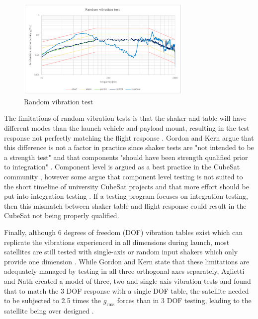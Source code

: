 \documentclass[a4paper,11pt]{article}
\begin{document}
\begin{figure}[H]
  \centering
  \includegraphics[width=0.75\textwidth]{images/random.png}
  \caption{Random vibration test \cite{nieto2019cubesat}}
  \label{fig:random}
\end{figure}

The limitations of random vibration tests is that the shaker and table will have different modes than the launch vehicle and payload mount, resulting in the test response not perfectly matching the flight response \cite{gordon2015benefits,aglietti2019spacecraft}. Gordon and Kern argue that this difference is not a factor in practice since shaker tests are "not intended to be a strength test"  \cite[p.~7]{gordon2015benefits} and that components "should have been strength qualified prior to integration" \cite[p.~7]{gordon2015benefits}. Component level is argued as a best practice in the CubeSat community \cite{rawsonbest}, however some argue that component level testing is not suited to the short timeline of university CubeSat projects and that more effort should be put into integration testing \cite{decker2016systems}. If a testing program focuses on integration testing, then this mismatch between shaker table and flight response could result in the CubeSat not being properly qualified.

Finally, although 6 degrees of freedom (DOF) vibration tables exist which can replicate the vibrations experienced in all dimensions during launch, most satellites are still tested with single-axis or random input shakers which only provide one dimension \cite{gordon2015benefits,aglietti2019spacecraft,nath2022study}. While Gordon and Kern \cite{gordon2015benefits} state that these limitations are adequately managed by testing in all three orthogonal axes separately, Aglietti and Nath \cite{nath2022study} created a model of three, two and single axis vibration tests and found that to match the 3 DOF response with a single DOF table, the satellite needed to be subjected to 2.5 times the $g_\text{rms}$ forces than in 3 DOF testing, leading to the satellite being over designed \cite{nath2022study}.
\end{document}
